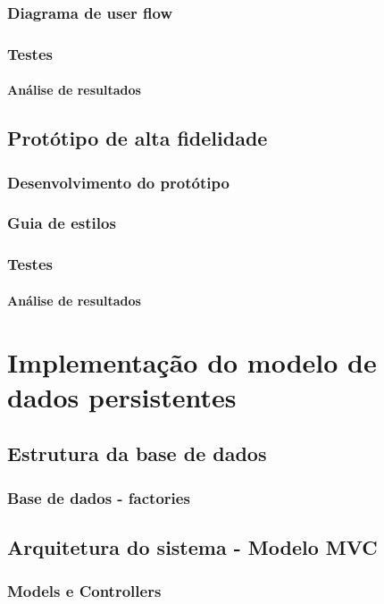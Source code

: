 \documentclass[11pt, twoside]{report}
\begin{document}
	\subsection{Diagrama de user flow}
	\subsection{Testes}
	\subsubsection{Análise de resultados}
	
	\section{Protótipo de alta fidelidade}
	\subsection{Desenvolvimento do protótipo}
	\subsection{Guia de estilos}
	\subsection{Testes}
	\subsubsection{Análise de resultados}
	
	\chapter{Implementação do modelo de dados persistentes}
	\section{Estrutura da base de dados}
	\subsection{Base de dados - factories}
	\section{Arquitetura do sistema - Modelo MVC}
	\subsection{Models e Controllers}
	
\end{document}
